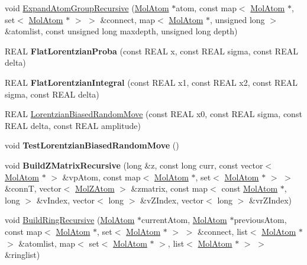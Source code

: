 \begin{DoxyCompactItemize}
\item 
void \mbox{\hyperlink{namespace_obj_cryst_aaea56c5b66035ea1a9749caa4c02f4bd}{Expand\+Atom\+Group\+Recursive}} (\mbox{\hyperlink{class_obj_cryst_1_1_mol_atom}{Mol\+Atom}} $\ast$atom, const map$<$ \mbox{\hyperlink{class_obj_cryst_1_1_mol_atom}{Mol\+Atom}} $\ast$, set$<$ \mbox{\hyperlink{class_obj_cryst_1_1_mol_atom}{Mol\+Atom}} $\ast$ $>$ $>$ \&connect, map$<$ \mbox{\hyperlink{class_obj_cryst_1_1_mol_atom}{Mol\+Atom}} $\ast$, unsigned long $>$ \&atomlist, const unsigned long maxdepth, unsigned long depth)
\item 
\mbox{\label{namespace_obj_cryst_af713f243eb12986e6b42132da53280dd}} 
R\+E\+AL {\bfseries Flat\+Lorentzian\+Proba} (const R\+E\+AL x, const R\+E\+AL sigma, const R\+E\+AL delta)
\item 
\mbox{\label{namespace_obj_cryst_a7a7f793b52aaccaccba115229b464511}} 
R\+E\+AL {\bfseries Flat\+Lorentzian\+Integral} (const R\+E\+AL x1, const R\+E\+AL x2, const R\+E\+AL sigma, const R\+E\+AL delta)
\item 
R\+E\+AL \mbox{\hyperlink{namespace_obj_cryst_a8b6775b47b6ebf273d5737006ffd3209}{Lorentzian\+Biased\+Random\+Move}} (const R\+E\+AL x0, const R\+E\+AL sigma, const R\+E\+AL delta, const R\+E\+AL amplitude)
\item 
\mbox{\label{namespace_obj_cryst_a1b0dec0281103b73c2e73a85e10a7a8e}} 
void {\bfseries Test\+Lorentzian\+Biased\+Random\+Move} ()
\item 
\mbox{\label{namespace_obj_cryst_a7cd387f3748bb230cebefc149392dd08}} 
void {\bfseries Build\+Z\+Matrix\+Recursive} (long \&z, const long curr, const vector$<$ \mbox{\hyperlink{class_obj_cryst_1_1_mol_atom}{Mol\+Atom}} $\ast$ $>$ \&vp\+Atom, const map$<$ \mbox{\hyperlink{class_obj_cryst_1_1_mol_atom}{Mol\+Atom}} $\ast$, set$<$ \mbox{\hyperlink{class_obj_cryst_1_1_mol_atom}{Mol\+Atom}} $\ast$ $>$ $>$ \&connT, vector$<$ \mbox{\hyperlink{struct_obj_cryst_1_1_mol_z_atom}{Mol\+Z\+Atom}} $>$ \&zmatrix, const map$<$ const \mbox{\hyperlink{class_obj_cryst_1_1_mol_atom}{Mol\+Atom}} $\ast$, long $>$ \&v\+Index, vector$<$ long $>$ \&v\+Z\+Index, vector$<$ long $>$ \&vr\+Z\+Index)
\item 
void \mbox{\hyperlink{namespace_obj_cryst_acb0b160e8f24597d041fd18e19bd8214}{Build\+Ring\+Recursive}} (\mbox{\hyperlink{class_obj_cryst_1_1_mol_atom}{Mol\+Atom}} $\ast$current\+Atom, \mbox{\hyperlink{class_obj_cryst_1_1_mol_atom}{Mol\+Atom}} $\ast$previous\+Atom, const map$<$ \mbox{\hyperlink{class_obj_cryst_1_1_mol_atom}{Mol\+Atom}} $\ast$, set$<$ \mbox{\hyperlink{class_obj_cryst_1_1_mol_atom}{Mol\+Atom}} $\ast$ $>$ $>$ \&connect, list$<$ \mbox{\hyperlink{class_obj_cryst_1_1_mol_atom}{Mol\+Atom}} $\ast$ $>$ \&atomlist, map$<$ set$<$ \mbox{\hyperlink{class_obj_cryst_1_1_mol_atom}{Mol\+Atom}} $\ast$ $>$, list$<$ \mbox{\hyperlink{class_obj_cryst_1_1_mol_atom}{Mol\+Atom}} $\ast$ $>$ $>$ \&ringlist)

\end{DoxyCompactItemize}
